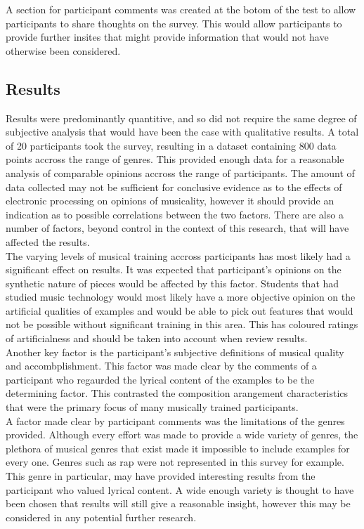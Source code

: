 \documentclass[titlepage]{scrartcl}
\begin{document}
    A section for participant comments was created at the botom of the test to
    allow participants to share thoughts on the survey. This would allow
    participants to provide further insites that might provide information that
    would not have otherwise been considered.

    \subsection{Results}
    Results were predominantly quantitive, and so did not require the same
    degree of subjective analysis that would have been the case with
    qualitative results.  A total of 20 participants took the survey, resulting
    in a dataset containing 800 data points accross the range of genres.  This
    provided enough data for a reasonable analysis of comparable opinions
    accross the range of participants. The amount of data collected may not be
    sufficient for conclusive evidence as to the effects of electronic
    processing on opinions of musicality, however it should provide an
    indication as to possible correlations between the two factors.
    There are also a number of factors, beyond control in the context of this
    research, that will have affected the results.\\

    The varying levels of musical training accross participants has most likely
    had a significant effect on results. It was expected that participant's
    opinions on the synthetic nature of pieces would be affected by this
    factor. Students that had studied music technology would most likely have a
    more objective opinion on the artificial qualities of examples and would be
    able to pick out features that would not be possible without significant
    training in this area. This has coloured ratings of artificialness and
    should be taken into account when review results.\\

    Another key factor is the participant's subjective definitions of musical
    quality and accombplishment. This factor was made clear by the comments of
    a participant who regaurded the lyrical content of the examples to be the
    determining factor. This contrasted the composition arangement
    characteristics that were the primary focus of many musically trained
    participants.\\
    
    A factor made clear by participant comments was the limitations of
    the genres provided. Although every effort was made to provide a wide
    variety of genres, the plethora of musical genres that exist made it
    impossible to include examples for every one. Genres such as rap were not
    represented in this survey for example. This genre in particular, may have
    provided interesting results from the participant who valued lyrical
    content. A wide enough variety is thought to have been chosen that results
    will still give a reasonable insight, however this may be considered in any
    potential further research.
\end{document}
